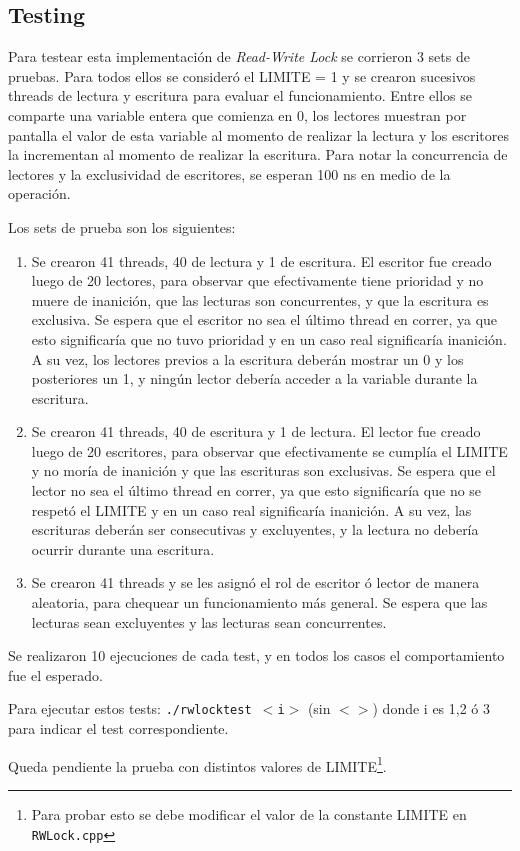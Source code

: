 \subsection{Testing}

Para testear esta implementación de {\it Read-Write Lock} se corrieron 3 sets de pruebas.  Para todos ellos se consideró el LIMITE = 1 y se crearon sucesivos threads de lectura y escritura para evaluar el funcionamiento.  Entre ellos se comparte una variable entera que comienza en 0, los lectores muestran por pantalla el valor de esta variable al momento de realizar la lectura y los escritores la incrementan al momento de realizar la escritura.  Para notar la concurrencia de lectores y la exclusividad de escritores, se esperan 100 ns en medio de la operación.

Los sets de prueba son los siguientes:

\begin{enumerate}
\item Se crearon 41 threads, 40 de lectura y 1 de escritura.  El escritor fue creado luego de 20 lectores, para observar que efectivamente tiene prioridad y no muere de inanición, que las lecturas son concurrentes, y que la escritura es exclusiva.  Se espera que el escritor no sea el último thread en correr, ya que esto significaría que no tuvo prioridad y en un caso real significaría inanición.  A su vez, los lectores previos a la escritura deberán mostrar un 0 y los posteriores un 1, y ningún lector debería acceder a la variable durante la escritura.
\item Se crearon 41 threads, 40 de escritura y 1 de lectura.  El lector fue creado luego de 20 escritores, para observar que efectivamente se cumplía el LIMITE y no moría de inanición y que las escrituras son exclusivas.  Se espera que el lector no sea el último thread en correr, ya que esto significaría que no se respetó el LIMITE y en un caso real significaría inanición.  A su vez, las escrituras deberán ser consecutivas y excluyentes, y la lectura no debería ocurrir durante una escritura.
\item Se crearon 41 threads y se les asignó el rol de escritor ó lector de manera aleatoria, para chequear un funcionamiento más general.  Se espera que las lecturas sean excluyentes y las lecturas sean concurrentes.
\end{enumerate}

Se realizaron 10 ejecuciones de cada test, y en todos los casos el comportamiento fue el esperado.

Para ejecutar estos tests: {\tt ./rwlocktest $<$i$>$} (sin $< >$) donde i es 1,2 ó 3 para indicar el test correspondiente.

Queda pendiente la prueba con distintos valores de LIMITE\footnote{Para probar esto se debe modificar el valor de la constante LIMITE en {\tt RWLock.cpp}}.